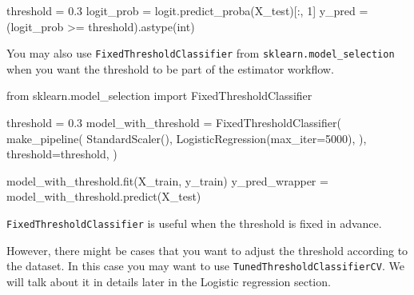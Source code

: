 \documentclass[
  letterpaper,
  DIV=11,
  numbers=noendperiod]{scrreprt}
\newenvironment{Shaded}{\begin{snugshade}}{\end{snugshade}}
\newcommand{\BuiltInTok}[1]{\textcolor[rgb]{0.00,0.23,0.31}{#1}}
\newcommand{\DecValTok}[1]{\textcolor[rgb]{0.68,0.00,0.00}{#1}}
\newcommand{\FloatTok}[1]{\textcolor[rgb]{0.68,0.00,0.00}{#1}}
\newcommand{\ImportTok}[1]{\textcolor[rgb]{0.00,0.46,0.62}{#1}}
\newcommand{\NormalTok}[1]{\textcolor[rgb]{0.00,0.23,0.31}{#1}}
\newcommand{\OperatorTok}[1]{\textcolor[rgb]{0.37,0.37,0.37}{#1}}
\theoremstyle{definition}
\theoremstyle{definition}
\theoremstyle{plain}
\theoremstyle{plain}
\theoremstyle{remark}
\begin{document}
\begin{Shaded}
\begin{Highlighting}[]
\NormalTok{threshold }\OperatorTok{=} \FloatTok{0.3}
\NormalTok{logit\_prob }\OperatorTok{=}\NormalTok{ logit.predict\_proba(X\_test)[:, }\DecValTok{1}\NormalTok{] }
\NormalTok{y\_pred }\OperatorTok{=}\NormalTok{ (logit\_prob }\OperatorTok{\textgreater{}=}\NormalTok{ threshold).astype(}\BuiltInTok{int}\NormalTok{)}
\end{Highlighting}
\end{Shaded}

You may also use \texttt{FixedThresholdClassifier} from
\texttt{sklearn.model\_selection} when you want the threshold to be part
of the estimator workflow.

\begin{Shaded}
\begin{Highlighting}[]
\ImportTok{from}\NormalTok{ sklearn.model\_selection }\ImportTok{import}\NormalTok{ FixedThresholdClassifier}

\NormalTok{threshold }\OperatorTok{=} \FloatTok{0.3}
\NormalTok{model\_with\_threshold }\OperatorTok{=}\NormalTok{ FixedThresholdClassifier(}
\NormalTok{    make\_pipeline(}
\NormalTok{        StandardScaler(),}
\NormalTok{        LogisticRegression(max\_iter}\OperatorTok{=}\DecValTok{5000}\NormalTok{),}
\NormalTok{    ),}
\NormalTok{    threshold}\OperatorTok{=}\NormalTok{threshold,}
\NormalTok{)}

\NormalTok{model\_with\_threshold.fit(X\_train, y\_train)}
\NormalTok{y\_pred\_wrapper }\OperatorTok{=}\NormalTok{ model\_with\_threshold.predict(X\_test)}
\end{Highlighting}
\end{Shaded}

\begin{tcolorbox}[enhanced jigsaw, arc=.35mm, bottomrule=.15mm, bottomtitle=1mm, breakable, colback=white, colbacktitle=quarto-callout-note-color!10!white, colframe=quarto-callout-note-color-frame, coltitle=black, left=2mm, leftrule=.75mm, opacityback=0, opacitybacktitle=0.6, rightrule=.15mm, title=\textcolor{quarto-callout-note-color}{\faInfo}\hspace{0.5em}{Note}, titlerule=0mm, toprule=.15mm, toptitle=1mm]

\texttt{FixedThresholdClassifier} is useful when the threshold is fixed
in advance.

However, there might be cases that you want to adjust the threshold
according to the dataset. In this case you may want to use
\texttt{TunedThresholdClassifierCV}. We will talk about it in details
later in the Logistic regression section.

\end{tcolorbox}
\end{document}
